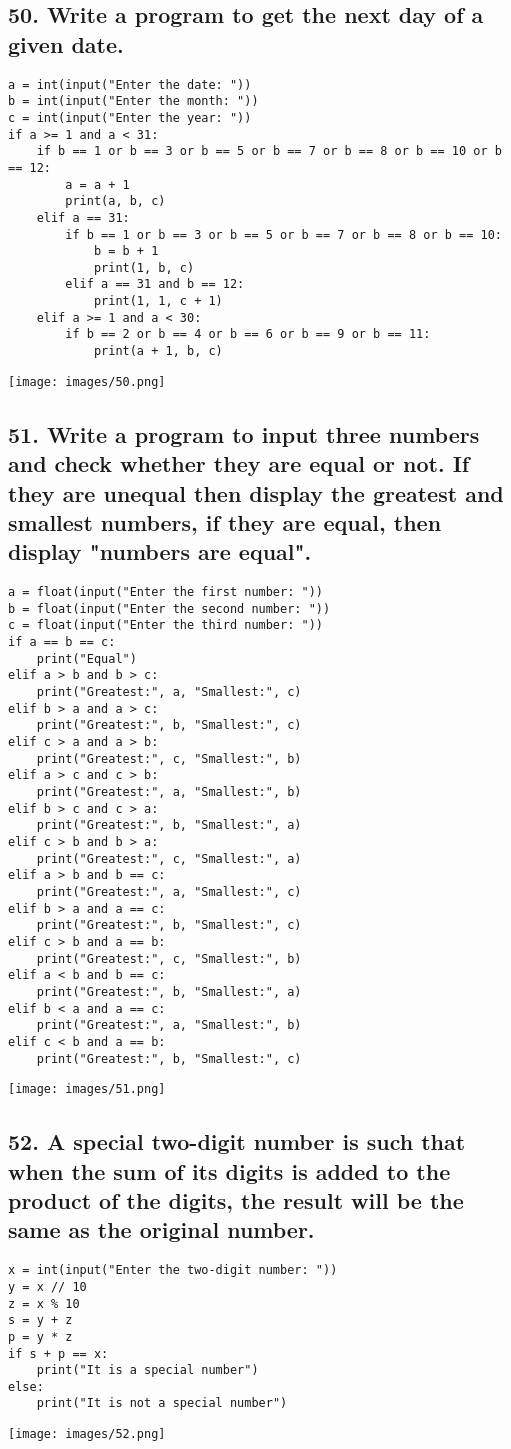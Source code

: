 \documentclass[12pt]{article}
\begin{document}
\subsection*{50. Write a program to get the next day of a given date.}
\begin{verbatim}
a = int(input("Enter the date: "))
b = int(input("Enter the month: "))
c = int(input("Enter the year: "))
if a >= 1 and a < 31:
    if b == 1 or b == 3 or b == 5 or b == 7 or b == 8 or b == 10 or b == 12:
        a = a + 1
        print(a, b, c)
    elif a == 31:
        if b == 1 or b == 3 or b == 5 or b == 7 or b == 8 or b == 10:
            b = b + 1
            print(1, b, c)
        elif a == 31 and b == 12:
            print(1, 1, c + 1)
    elif a >= 1 and a < 30:
        if b == 2 or b == 4 or b == 6 or b == 9 or b == 11:
            print(a + 1, b, c)
\end{verbatim}
\texttt{[image: images/50.png]}

\subsection*{51. Write a program to input three numbers and check whether they are equal or not. If they are unequal then display the greatest and smallest numbers, if they are equal, then display "numbers are equal".}
\begin{verbatim}
a = float(input("Enter the first number: "))
b = float(input("Enter the second number: "))
c = float(input("Enter the third number: "))
if a == b == c:
    print("Equal")
elif a > b and b > c:
    print("Greatest:", a, "Smallest:", c)
elif b > a and a > c:
    print("Greatest:", b, "Smallest:", c)
elif c > a and a > b:
    print("Greatest:", c, "Smallest:", b)
elif a > c and c > b:
    print("Greatest:", a, "Smallest:", b)
elif b > c and c > a:
    print("Greatest:", b, "Smallest:", a)
elif c > b and b > a:
    print("Greatest:", c, "Smallest:", a)
elif a > b and b == c:
    print("Greatest:", a, "Smallest:", c)
elif b > a and a == c:
    print("Greatest:", b, "Smallest:", c)
elif c > b and a == b:
    print("Greatest:", c, "Smallest:", b)
elif a < b and b == c:
    print("Greatest:", b, "Smallest:", a)
elif b < a and a == c:
    print("Greatest:", a, "Smallest:", b)
elif c < b and a == b:
    print("Greatest:", b, "Smallest:", c)
\end{verbatim}
\texttt{[image: images/51.png]}

\subsection*{52. A special two-digit number is such that when the sum of its digits is added to the product of the digits, the result will be the same as the original number.}
\begin{verbatim}
x = int(input("Enter the two-digit number: "))
y = x // 10
z = x % 10
s = y + z
p = y * z
if s + p == x:
    print("It is a special number")
else:
    print("It is not a special number")
\end{verbatim}
\texttt{[image: images/52.png]}
\end{document}

